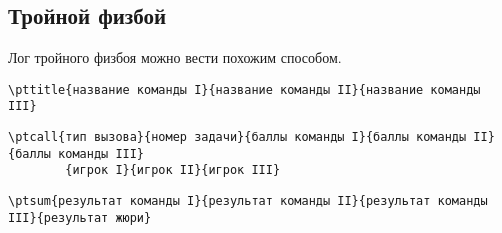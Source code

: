 \subsection{Тройной физбой}

Лог тройного физбоя можно вести похожим способом.

\begin{lstlisting}[gobble = 3]
    \pttitle{название команды I}{название команды II}{название команды III}
\end{lstlisting}

\begin{lstlisting}[gobble = 3]
    \ptcall{тип вызова}{номер задачи}{баллы команды I}{баллы команды II}{баллы команды III}
        {игрок I}{игрок II}{игрок III}
\end{lstlisting}

\begin{lstlisting}[gobble = 3]
    \ptsum{результат команды I}{результат команды II}{результат команды III}{результат жюри}
\end{lstlisting}